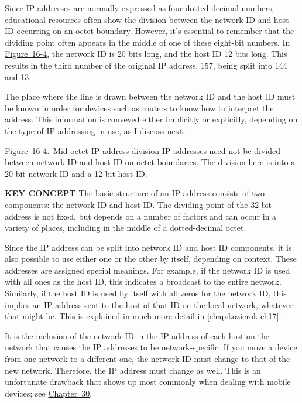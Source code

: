 Since IP addresses are normally expressed as four dotted-decimal
numbers, educational resources often show the division between the
network ID and host ID occurring on an octet boundary. However, it's
essential to remember that the dividing point often appears in the
middle of one of these eight-bit numbers. In
\protect\hyperlink{ch16s03.htmlux5cux23mid-octet_ip_address_division_ip_address}{Figure~16-4},
the network ID is 20 bits long, and the host ID 12 bits long. This
results in the third number of the original IP address, 157, being split
into 144 and 13.

The place where the line is drawn between the network ID and the host ID
must be known in order for devices such as routers to know how to
interpret the address. This information is conveyed either implicitly or
explicitly, depending on the type of IP addressing in use, as I discuss
next.

\protect\hypertarget{ch16s03.htmlux5cux23mid-octet_ip_address_division_ip_address}{}{}

\protect\hypertarget{ch16s03.htmlux5cux23I_mediaobject2_d1e16127}{}{}

Figure~16-4.~Mid-octet IP address division IP addresses need not be
divided between network ID and host ID on octet boundaries. The division
here is into a 20-bit network ID and a 12-bit host ID.


{\textbf{KEY CONCEPT}} The basic structure of an IP address consists of
two components: the network ID and host ID. The dividing point of the
32-bit address is not fixed, but depends on a number of factors and can
occur in a variety of places, including in the middle of a
dotted-decimal octet.

Since the IP address can be split into network ID and host ID
components, it is also possible to use either one or the other by
itself, depending on context. These addresses are assigned special
meanings. For example, if the network ID is used with all ones as the
host ID, this indicates a broadcast to the entire network. Similarly, if
the host ID is used by itself with all zeros for the network ID, this
implies an IP address sent to the host of that ID on the local network,
whatever that might be.
This is explained in much more detail in \vref{chap:kozierok-ch17}.

It is the inclusion of the network ID in the IP address of each host on
the network that causes the IP addresses to be network-specific. If you
move a device from one network to a different one, the network ID must
change to that of the new network. Therefore, the IP address must change
as well. This is an unfortunate drawback that shows up most commonly
when dealing with mobile devices; see
\protect\hyperlink{ch30.html}{Chapter~30}.


